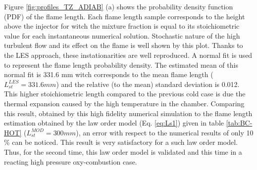 \documentclass[twocolumn,10pt]{asme2e}
\begin{document}
Figure \ref{fig:profiles_TZ_ADIAB} (a) shows the probability density function (PDF) of the flame length. Each flame length sample corresponds to the height above the injector for witch the mixture fraction is equal to its stoichiometric value for each instantaneous numerical solution. Stochastic nature of the high turbulent flow and its effect on the flame is well shown by this plot. Thanks to the LES approach, these instationarities are well reproduced. A normal fit is used to represent the flame length probability density. The estimated mean of this normal fit is 331.6 mm witch corresponds to the mean flame length ($L^{LES}_{st}=331.6 mm$) and the relative (to the mean) standard deviation is 0.012. This higher stoichiometric length compared to the previous cold case is due the thermal expansion caused by the high temperature in the chamber. Comparing this result, obtained by this high fidelity numerical simulation to the flame length estimation obtained by the law order model (Eq. \ref{eq:Ls1}) given in table \ref{tab:BC-HOT} ($L^{MOD}_{st}=300mm$), an error with respect to the numerical results of only 10 \% can be noticed. This result is very satisfactory for a such law order model. Thus, for the second time, this law order model is validated and this time in a reacting high pressure oxy-combustion case.  
\end{document}
